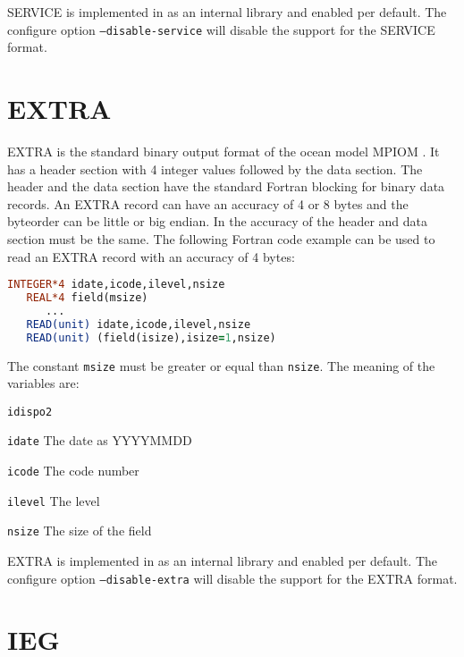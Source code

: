 SERVICE is implemented in {\CDI} as an internal library and enabled per default.
The configure option {\tt --disable-service} will disable the support for the SERVICE format.

\section{EXTRA}

EXTRA is the standard binary output format of the ocean model MPIOM \cite{MPIOM}.
It has a header section with 4 integer values followed by the data section. 
The header and the data section have the standard Fortran blocking for binary data records.
An EXTRA record can have an accuracy of 4 or 8 bytes and the byteorder can be little or big endian.
In {\CDI} the accuracy of the header and data section must be the same.
The following Fortran code example can be used to read an EXTRA record with an accuracy of 4 bytes:

\begin{lstlisting}[language=Fortran, backgroundcolor=\color{pyellow}, basicstyle=\small, columns=flexible]
   INTEGER*4 idate,icode,ilevel,nsize
   REAL*4 field(msize)
      ...
   READ(unit) idate,icode,ilevel,nsize
   READ(unit) (field(isize),isize=1,nsize)
\end{lstlisting}

The constant {\tt msize} must be greater or equal than {\tt nsize}.
The meaning of the variables are:

\vspace*{3mm}
\hspace*{8mm}\begin{minipage}{10cm}
\begin{deflist}{{\tt idispo2 \ \ }}
\item[{\tt idate}]    The date as YYYYMMDD
\item[{\tt icode}]    The code number
\item[{\tt ilevel}]   The level
\item[{\tt nsize}]    The size of the field
\end{deflist}
\end{minipage}
\vspace*{3mm}

EXTRA is implemented in {\CDI} as an internal library and enabled per default.
The configure option {\tt --disable-extra} will disable the support for the EXTRA format.


\section{IEG}

